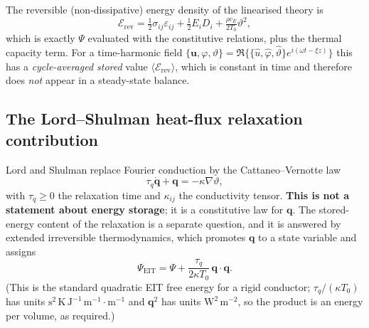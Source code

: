 \documentclass[11pt]{article}
\newcommand{\s}{\sigma}
\newcommand{\eps}{\varepsilon}
\newcommand{\bth}{\vartheta}
\newcommand{\bu}{\bm{u}}
\newcommand{\bq}{\bm{q}}
\theoremstyle{plain}
\begin{document}
The reversible (non-dissipative) energy density of the linearised theory is
\begin{equation}
\mathcal{E}_{\mathrm{rev}}
 = \tfrac12\s_{ij}\eps_{ij}+\tfrac12 E_i D_i+\tfrac{\rho c_E}{2T_0}\bth^2 ,
\label{eq:erev}
\end{equation}
which is exactly $\Psi$ evaluated with the constitutive relations, plus the
thermal capacity term. For a time-harmonic field
$\{\bu,\varphi,\bth\}=\Re\{\{\hat u,\hat\varphi,\hat\vartheta\}e^{i(\omega t-\xi z)}\}$
this has a \emph{cycle-averaged stored} value
$\langle\mathcal E_{\mathrm{rev}}\rangle$, which is constant in time and
therefore does \emph{not} appear in a steady-state balance.

\subsection{The Lord--Shulman heat-flux relaxation contribution}
\label{sec:ls-relax}

Lord and Shulman replace Fourier conduction by the Cattaneo--Vernotte law
\begin{equation}
\tau_q \dot{\bq}+\bq=-\kappa\nabla\bth ,
\label{eq:cv}
\end{equation}
with $\tau_q\ge0$ the relaxation time and $\kappa_{ij}$ the conductivity
tensor. \textbf{This is not a statement about energy storage}; it is a
constitutive law for $\bq$. The stored-energy content of the relaxation is a
separate question, and it is answered by extended irreversible thermodynamics,
which promotes $\bq$ to a state variable and assigns
\begin{equation}
\Psi_{\mathrm{EIT}}=\Psi+\frac{\tau_q}{2\kappa T_0}\,\bq\!\cdot\!\bq .
\label{eq:eit}
\end{equation}
(This is the standard quadratic EIT free energy for a rigid conductor;
$\tau_q/(\kappa T_0)$ has units $\mathrm{s^2\,K\,J^{-1}\,m^{-1}}\cdot
\mathrm{m^{-1}}$ and $\bq^2$ has units $\mathrm{W^2\,m^{-2}}$, so the product
is an energy per volume, as required.)
\end{document}

